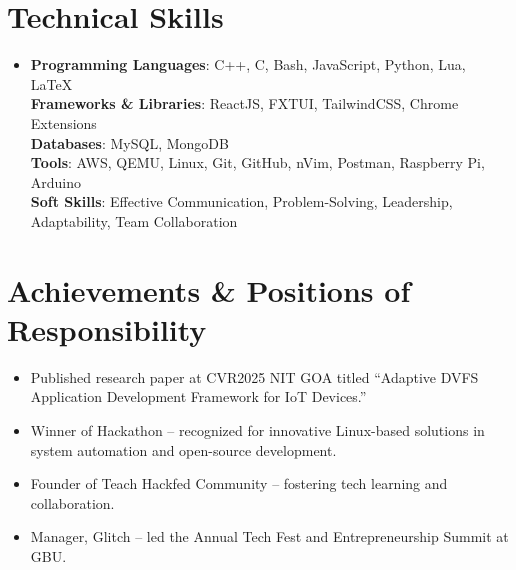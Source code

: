 \documentclass[letterpaper,10pt]{article}
\newcommand{\resumeItem}[1]{\item\small{#1 \vspace{-2pt}}}
\newcommand{\resumeItemListStart}{\begin{itemize}}
\newcommand{\resumeItemListEnd}{\end{itemize}\vspace{-5pt}}
\begin{document}
\section{Technical Skills}
\begin{itemize}[leftmargin=0.15in, label={}]
  \item{
    \small{
      \textbf{Programming Languages}{: C++, C, Bash, JavaScript, Python, Lua, LaTeX} \\
      \textbf{Frameworks \& Libraries}{: ReactJS, FXTUI, TailwindCSS, Chrome Extensions} \\
      \textbf{Databases}{: MySQL, MongoDB} \\
      \textbf{Tools}{: AWS, QEMU, Linux, Git, GitHub, nVim, Postman, Raspberry Pi, Arduino} \\
      \textbf{Soft Skills}{: Effective Communication, Problem-Solving, Leadership, Adaptability, Team Collaboration}
    }
  }
\end{itemize}


\section{Achievements \& Positions of Responsibility}
\resumeItemListStart
  \resumeItem{Published research paper at CVR2025 NIT GOA titled “Adaptive DVFS Application Development Framework for IoT Devices.”}
  \resumeItem{Winner of Hackathon – recognized for innovative Linux-based solutions in system automation and open-source development.}
  \resumeItem{Founder of Teach Hackfed Community – fostering tech learning and collaboration.}
  \resumeItem{Manager, Glitch – led the Annual Tech Fest and Entrepreneurship Summit at GBU.}
\resumeItemListEnd
\end{document}
